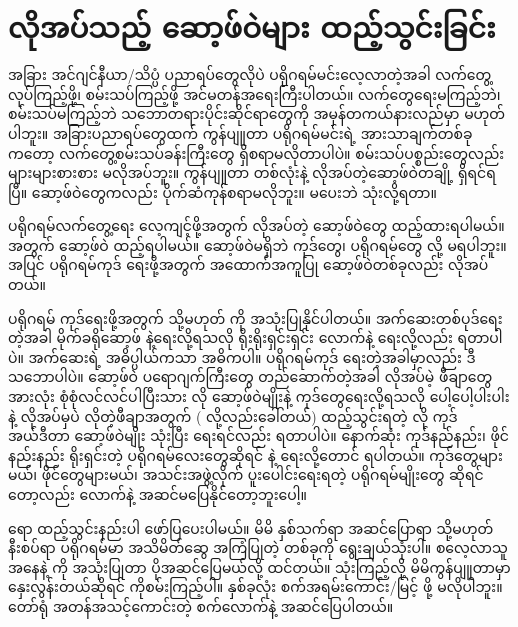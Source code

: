 \chapter{လိုအပ်သည့် ဆော့ဖ်ဝဲများ ထည့်သွင်းခြင်း} \label{apdx:01}

အခြား အင်ဂျင်နီယာ/သိပ္ပံ ပညာရပ်တွေလိုပဲ ပရိုဂရမ်မင်းလေ့လာတဲ့အခါ လက်တွေ့လုပ်ကြည့်ဖို့၊ စမ်းသပ်ကြည့်ဖို့ အင်မတန်အရေးကြီးပါတယ်။ လက်တွေရေးမကြည့်ဘဲ၊ စမ်းသပ်မကြည့်ဘဲ သဘောတရားပိုင်းဆိုင်ရာတွေကို အမှန်တကယ်နားလည်မှာ မဟုတ်ပါဘူး။ အခြားပညာရပ်တွေထက် ကွန်ပျူတာ ပရိုဂရမ်မင်းရဲ့ အားသာချက်တစ်ခုကတော့ လက်တွေ့စမ်းသပ်ခန်းကြီးတွေ ရှိစရာမလိုတာပါပဲ။ စမ်းသပ်ပစ္စည်းတွေလည်း များများစားစား မလိုအပ်ဘူး။ ကွန်ပျူတာ တစ်လုံးနဲ့ လိုအပ်တဲ့ဆော့ဖ်ဝဲတချို့ ရှိရင်ရပြီ။ ဆော့ဖ်ဝဲတွေကလည်း ပိုက်ဆံကုန်စရာမလိုဘူး။ မပေးဘဲ သုံးလို့ရတာ။ 

ပရိုဂရမ်လက်တွေ့ရေး လေ့ကျင့်ဖို့အတွက် လိုအပ်တဲ့ ဆော့ဖ်ဝဲတွေ ထည့်ထားရပါမယ်။  အတွက်  ဆော့ဖ်ဝဲ ထည့်ရပါမယ်။  ဆော့ဖ်ဝဲမရှိဘဲ  ကုဒ်တွေ၊  ပရိုဂရမ်တွေ  လို့ မရပါဘူး။   အပြင် ပရိုဂရမ်ကုဒ် ရေးဖို့အတွက် အထောက်အကူပြု ဆော့ဖ်ဝဲတစ်ခုလည်း လိုအပ်တယ်။

ပရိုဂရမ် ကုဒ်ရေးဖို့အတွက်  သို့မဟုတ်  ကို အသုံးပြုနိုင်ပါတယ်။ အက်ဆေးတစ်ပုဒ်ရေးတဲ့အခါ မိုက်ခရိုဆော့ဖ်  နဲ့ရေးလို့ရသလို ရိုးရိုးရှင်းရှင်း   လောက်နဲ့ ရေးလို့လည်း ရတာပါပဲ။ အက်ဆေးရဲ့ အဓိပ္ပါယ်ကသာ အဓိကပါ။ ပရိုဂရမ်ကုဒ် ရေးတဲ့အခါမှာလည်း ဒီသဘောပါပဲ။ ဆော့ဖ်ဝဲ ပရောဂျက်ကြီးတွေ တည်ဆောက်တဲ့အခါ လိုအပ်မဲ့ ဖီချာတွေအားလုံး စုံစုံလင်လင်ပါပြီးသား  လို  ဆော့ဖ်ဝဲမျိုးနဲ့ ကုဒ်တွေရေးလို့ရသလို  ပေါ့ပေါ့ပါးပါးနဲ့ လိုအပ်မှပဲ လိုတဲ့ဖီချာအတွက်  ( လို့လည်းခေါ်တယ်) ထည့်သွင်းရတဲ့  လို ကုဒ်အယ်ဒီတာ  ဆော့ဖ်ဝဲမျိုး သုံးပြီး ရေးရင်လည်း ရတာပါပဲ။ နောက်ဆုံး ကုဒ်နည်နည်း၊ ဖိုင်နည်းနည်း ရိုးရှင်းတဲ့ ပရိုဂရမ်လေးတွေဆိုရင်  နဲ့ ရေးလို့တောင် ရပါတယ်။ ကုဒ်တွေများမယ်၊ ဖိုင်တွေများမယ်၊ အသင်းအဖွဲ့လိုက် ပူးပေါင်းရေးရတဲ့ ပရိုဂရမ်မျိုးတွေ ဆိုရင်တော့လည်း  လောက်နဲ့ အဆင်မပြေနိုင်တော့ဘူးပေါ့။ 

 ရော   ထည့်သွင်းနည်းပါ ဖော်ပြပေးပါမယ်။ မိမိ နှစ်သက်ရာ အဆင်ပြောရာ သို့မဟုတ် နီးစပ်ရာ ပရိုဂရမ်မာ အသိမိတ်ဆွေ အကြံပြုတဲ့  တစ်ခုကို ရွေးချယ်သုံးပါ။ စလေ့လာသူအနေနဲ့  ကို အသုံးပြုတာ ပိုအဆင်ပြေမယ်လို့ ထင်တယ်။  သုံးကြည့်လို့ မိမိကွန်ပျူတာမှာ နှေးလွန်းတယ်ဆိုရင်  ကိုစမ်းကြည့်ပါ။ နှစ်ခုလုံး စက်အရမ်းကောင်း/မြင့် ဖို့ မလိုပါဘူး။ တော်ရုံ အတန်အသင့်ကောင်းတဲ့ စက်လောက်နဲ့ အဆင်ပြေပါတယ်။

